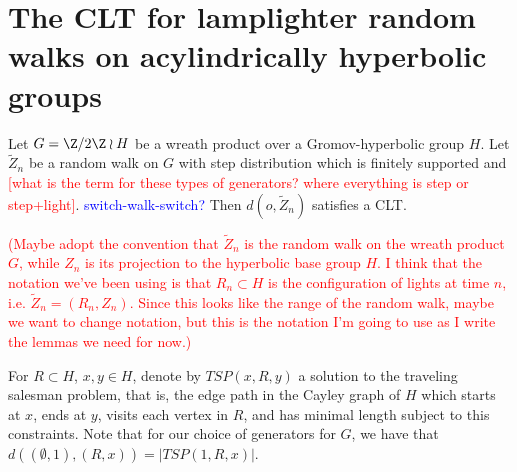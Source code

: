 
\section{The CLT for lamplighter random walks on acylindrically hyperbolic groups}

\begin{thm} \label{thm:lamplighterCLT}
    Let $G = \Z/2\Z \wr H$ be 
    a wreath product over a Gromov-hyperbolic group $H$. Let $\tilde{Z}_n$
    be a random walk on $G$ with 
    step distribution which is finitely supported and \textcolor{red}{[what is the term for these types of generators? where everything is step or step+light]}. \textcolor{blue}{switch-walk-switch?}
    Then $d(o,\tilde{Z}_n)$ satisfies a CLT.
\end{thm}

\textcolor{red}{(Maybe adopt the convention that $\tilde{Z}_n$ is the random walk on the wreath product $G$, while $Z_n$ is its projection to the hyperbolic base group $H$. I think that the notation we've been using is that $R_n \subset H$ is the configuration of lights at time $n$, i.e.
$\tilde{Z}_n = (R_n, Z_n)$. Since this looks like the range of the random walk, maybe we want to change notation, but this is the notation I'm going to use as I write the lemmas we need for now.)}

For $R \subset H$, $x,y \in H$,
denote by $TSP(x,R,y)$ a solution to the traveling salesman problem, that is, the edge path in the Cayley graph of $H$ which starts at $x$, ends at $y$, visits each vertex in $R$, and has minimal length subject to this constraints.
Note that for our choice of generators for $G$, we have that $d((\emptyset,1),(R,x)) = |TSP(1,R,x)|$.


